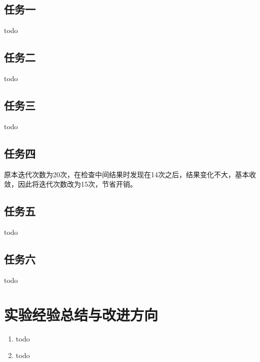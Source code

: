 \documentclass[a4paper,UTF8]{article}
\numberwithin{equation}{section}
\begin{document}
\subsection{任务一}
todo

\subsection{任务二}
todo

\subsection{任务三}
todo

\subsection{任务四}
原本迭代次数为20次，在检查中间结果时发现在14次之后，结果变化不大，基本收敛，因此将迭代次数改为15次，节省开销。
\subsection{任务五}
todo

\subsection{任务六}
todo
\section{实验经验总结与改进方向}
\begin{enumerate}[1)]
    \item todo
    \item todo
\end{enumerate}


\end{document}
